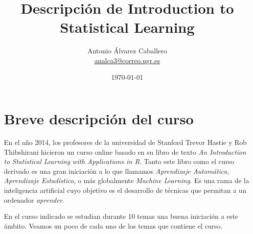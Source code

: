 \documentclass[a4paper, 11pt]{article}
\title{Descripción de Introduction to Statistical Learning}
\author{Antonio Álvarez Caballero\\
    \href{mailto:analca3@correo.ugr.es}{analca3@correo.ugr.es}}
\date{\today}
\theoremstyle{definition}
\begin{document}
  \maketitle
  \tableofcontents
  \newpage

  \section{Breve descripción del curso}

  En el año 2014, los profesores de la universidad de Stanford Trevor Hastie y Rob Thibshirani hicieron un curso online basado en su libro de texto \emph{An Introduction to Statistical Learning with Applications in R}. Tanto este libro como el curso derivado es una gran iniciación a lo que llamamos \emph{Aprendizaje Automático}, \emph{Aprendizaje Estadístico}, o más globalmente \emph{Machine Learning}. Es una rama de la inteligencia artificial cuyo objetivo es el desarrollo de técnicas que permitan a un ordenador \emph{aprender}.

  En el curso indicado se estudian durante 10 temas una buena iniciación a este ámbito. Veamos un poco de cada uno de los temas que contiene el curso.
\end{document}
